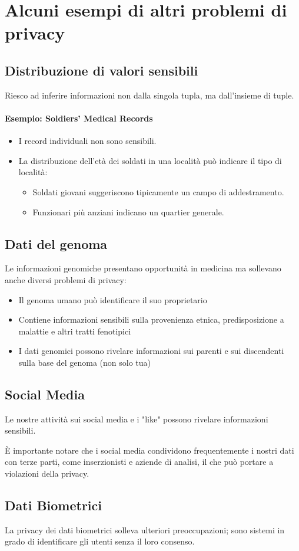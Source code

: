 \documentclass{report}
\begin{document}
\chapter{Alcuni esempi di altri problemi di privacy}
\section{Distribuzione di valori sensibili}
Riesco ad inferire informazioni non dalla singola tupla, ma dall'insieme di tuple.
\subsubsection{Esempio: Soldiers' Medical Records}
\begin{itemize}
    \item I record individuali non sono sensibili.
    \item La distribuzione dell'età dei soldati in una località può indicare il tipo di località:
    \begin{itemize}
        \item Soldati giovani suggeriscono tipicamente un campo di addestramento.
        \item Funzionari più anziani indicano un quartier generale.
    \end{itemize}
\end{itemize}

\section{Dati del genoma}
Le informazioni genomiche presentano opportunità in medicina ma sollevano anche diversi problemi di privacy:
\begin{itemize}
    \item Il genoma umano può identificare il suo proprietario
    \item Contiene informazioni sensibili sulla provenienza etnica, predisposizione a malattie e altri tratti fenotipici
    \item I dati genomici possono rivelare informazioni sui parenti e sui discendenti sulla base del genoma (non solo tua)
\end{itemize}

\section{Social Media}
Le nostre attività sui social media e i "like" possono rivelare informazioni sensibili. 

È importante notare che i social media condividono frequentemente i nostri dati con terze parti, come inserzionisti e aziende di analisi, il che può portare a violazioni della privacy.

\section{Dati Biometrici}
La privacy dei dati biometrici solleva ulteriori preoccupazioni; sono sistemi in grado di identificare gli utenti 
senza il loro consenso.
\end{document}
